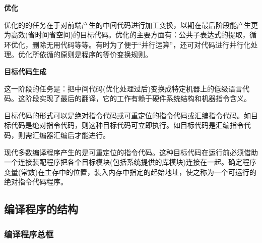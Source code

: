 \noindent\textbf{优化}

优化的的任务在于对前端产生的中间代码进行加工变换，以期在最后阶段能产生更为高效(省时间省空间)的目标代码。优化的主要方面有：公共子表达式的提取，循环优化，删除无用代码等等。有时为了便于``并行运算''，还可对代码进行并行化处理。优化所依循的原则是程序的等价变换规则。

\noindent\textbf{目标代码生成}

这一阶段的任务是：把中间代码(优化处理过后)变换成特定机器上的低级语言代码。这阶段实现了最后的翻译，它的工作有赖于硬件系统结构和机器指令含义。

目标代码的形式可以是绝对指令代码或可重定位的指令代码或汇编指令代码。如目标代码是绝对指令代码，则这种目标代码可立即执行。如目标代码是汇编指令代码，则需汇编器汇编后才能进行。

现代多数编译程序产生的是可重定位的指令代码。这种目标代码在运行前必须借助一个连接装配程序把各个目标模块(包括系统提供的库模块)连接在一起。确定程序变量(常数)在主存中的位置，装入内存中指定的起始地址，使之称为一个可运行的绝对指令代码程序。

\subsection{编译程序的结构}
\subsubsection{\textcolor{imp}{编译程序总框}}

